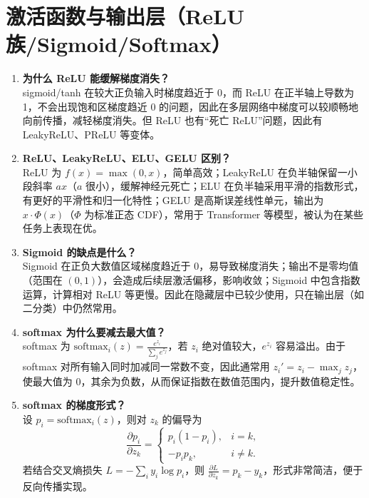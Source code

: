 \documentclass{article}
\begin{document}
\section{激活函数与输出层（ReLU族/Sigmoid/Softmax）}
\begin{enumerate}
\item \textbf{为什么 ReLU 能缓解梯度消失？}\\
sigmoid/tanh 在较大正负输入时梯度趋近于 0，而 ReLU 在正半轴上导数为 1，不会出现饱和区梯度趋近 0 的问题，因此在多层网络中梯度可以较顺畅地向前传播，减轻梯度消失。但 ReLU 也有“死亡 ReLU”问题，因此有 LeakyReLU、PReLU 等变体。

\item \textbf{ReLU、LeakyReLU、ELU、GELU 区别？}\\
ReLU 为 $f(x)=\max(0,x)$，简单高效；LeakyReLU 在负半轴保留一小段斜率 $ax$（$a$ 很小），缓解神经元死亡；ELU 在负半轴采用平滑的指数形式，有更好的平滑性和归一化特性；GELU 是高斯误差线性单元，输出为 $x \cdot \Phi(x)$（$\Phi$ 为标准正态 CDF），常用于 Transformer 等模型，被认为在某些任务上表现在优。

\item \textbf{Sigmoid 的缺点是什么？}\\
Sigmoid 在正负大数值区域梯度趋近于 0，易导致梯度消失；输出不是零均值（范围在 $(0,1)$），会造成后续层激活偏移，影响收敛；Sigmoid 中包含指数运算，计算相对 ReLU 等更慢。因此在隐藏层中已较少使用，只在输出层（如二分类）中仍然常用。

\item \textbf{softmax 为什么要减去最大值？}\\
softmax 为 $\text{softmax}_i(z)=\frac{e^{z_i}}{\sum_j e^{z_j}}$，若 $z_i$ 绝对值较大，$e^{z_i}$ 容易溢出。由于 softmax 对所有输入同时加减同一常数不变，因此通常用 $z_i' = z_i - \max_j z_j$，使最大值为 0，其余为负数，从而保证指数在数值范围内，提升数值稳定性。

\item \textbf{softmax 的梯度形式？}\\
设 $p_i = \text{softmax}_i(z)$，则对 $z_k$ 的偏导为
\[
\frac{\partial p_i}{\partial z_k} =
\begin{cases}
p_i(1 - p_i), & i = k,\\
-p_i p_k, & i \ne k.
\end{cases}
\]
若结合交叉熵损失 $L = -\sum_i y_i \log p_i$，则 $\frac{\partial L}{\partial z_k} = p_k - y_k$，形式非常简洁，便于反向传播实现。
\end{enumerate}
\end{document}
